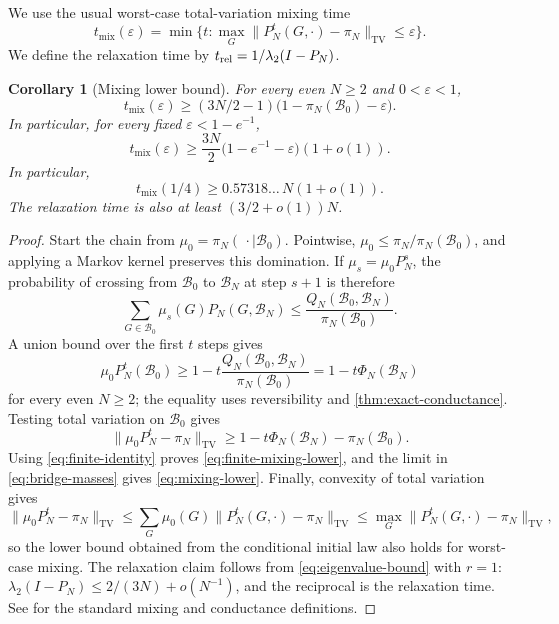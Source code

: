 \documentclass[11pt]{article}
\newcommand{\TV}{\mathrm{TV}}
\theoremstyle{plain}
\newtheorem{corollary}[corollary]{Corollary}
\theoremstyle{definition}
\numberwithin{equation}{section}
\begin{document}
We use the usual worst-case total-variation mixing time
\[
  t_{\mathrm{mix}}(\varepsilon)=
  \min\bigl\{t:\max_G\|P_N^t(G,\cdot)-\pi_N\|_{\TV}\leq\varepsilon\bigr\}.
\]
We define the relaxation time by
$t_{\rm rel}=1/\lambda_2(I-P_N)$.

\begin{corollary}[Mixing lower bound]\label{cor:mixing}
For every even $N\geq2$ and $0<\varepsilon<1$,
\begin{equation}\label{eq:finite-mixing-lower}
 t_{\mathrm{mix}}(\varepsilon)
 \geq(3N/2-1)\bigl(1-\pi_N(\mathcal B_0)-\varepsilon\bigr).
\end{equation}
In particular, for every fixed $\varepsilon<1-e^{-1}$,
\begin{equation}\label{eq:mixing-lower}
  t_{\mathrm{mix}}(\varepsilon)
  \geq \frac{3N}{2}
      \bigl(1-e^{-1}-\varepsilon\bigr)(1+o(1)).
\end{equation}
In particular,
\[
  t_{\mathrm{mix}}(1/4)\geq0.57318\ldots\,N(1+o(1)).
\]
The relaxation time is also at least $(3/2+o(1))N$.
\end{corollary}

\begin{proof}
Start the chain from $\mu_0=\pi_N(\,\cdot\mid\mathcal B_0)$.  Pointwise,
$\mu_0\leq\pi_N/\pi_N(\mathcal B_0)$, and applying a Markov kernel preserves
this domination.  If $\mu_s=\mu_0P_N^s$, the probability of crossing from
$\mathcal B_0$ to $\mathcal B_N$ at step $s+1$ is therefore
\[
 \sum_{G\in\mathcal B_0}\mu_s(G)P_N(G,\mathcal B_N)
 \leq
 \frac{Q_N(\mathcal B_0,\mathcal B_N)}{\pi_N(\mathcal B_0)}.
\]
A union bound over the first $t$ steps gives
\[
  \mu_0P_N^t(\mathcal B_0)
  \geq1-t\frac{Q_N(\mathcal B_0,\mathcal B_N)}
                       {\pi_N(\mathcal B_0)}
  =1-t\Phi_N(\mathcal B_N)
\]
for every even $N\geq2$; the equality uses reversibility and
\cref{thm:exact-conductance}.  Testing total variation on
$\mathcal B_0$ gives
\[
 \|\mu_0P_N^t-\pi_N\|_{\TV}
 \geq1-t\Phi_N(\mathcal B_N)-\pi_N(\mathcal B_0).
\]
Using \eqref{eq:finite-identity} proves \eqref{eq:finite-mixing-lower}, and
the limit in \eqref{eq:bridge-masses} gives \eqref{eq:mixing-lower}.
Finally, convexity of total variation gives
\[
 \|\mu_0P_N^t-\pi_N\|_{\TV}
 \leq\sum_G\mu_0(G)\|P_N^t(G,\cdot)-\pi_N\|_{\TV}
 \leq\max_G\|P_N^t(G,\cdot)-\pi_N\|_{\TV},
\]
so the lower bound obtained from the conditional initial law also holds for
worst-case mixing.
The relaxation claim follows from \eqref{eq:eigenvalue-bound} with $r=1$:
$\lambda_2(I-P_N)\leq2/(3N)+o(N^{-1})$, and the reciprocal is the relaxation
time.  See \cite{LevinPeres2017} for the standard mixing and conductance
definitions.
\end{proof}
\end{document}
